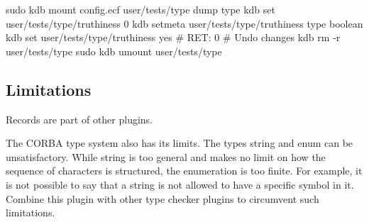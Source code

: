 \begin{DoxyCode}
sudo kdb mount config.ecf user/tests/type dump type
kdb set user/tests/type/truthiness 0
kdb setmeta user/tests/type/truthiness type boolean
 kdb set user/tests/type/truthiness yes
# RET: 0
 # Undo changes
kdb rm -r user/tests/type
sudo kdb umount user/tests/type
\end{DoxyCode}


\subsection*{Limitations}

Records are part of other plugins.

The {\ttfamily C\+O\+R\+BA} type system also has its limits. The types {\ttfamily string} and {\ttfamily enum} can be unsatisfactory. While string is too general and makes no limit on how the sequence of characters is structured, the enumeration is too finite. For example, it is not possible to say that a string is not allowed to have a specific symbol in it. Combine this plugin with other type checker plugins to circumvent such limitations. 